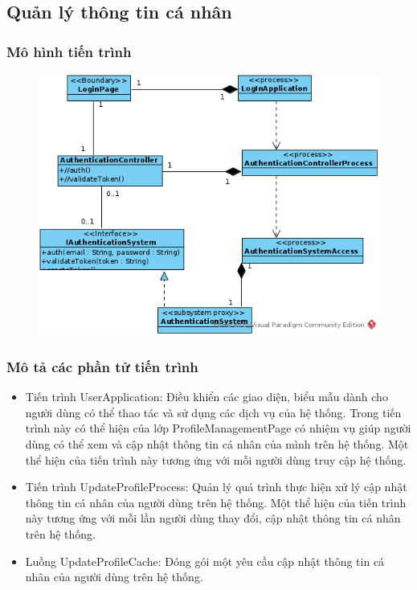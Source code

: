 \documentclass[./../main_file.tex]{subfiles}
\begin{document}
\subsection{Quản lý thông tin cá nhân}

\subsubsection{Mô hình tiến trình}

\begin{figure}[H]
	\centering
	\includegraphics[width=\linewidth]{./images/pv_login.png}
\end{figure}

\subsubsection{Mô tả các phần tử tiến trình}
\begin{itemize}
	\item Tiến trình UserApplication: Điều khiển các giao diện, biểu mẫu dành cho người dùng có thể thao tác và sử dụng các dịch vụ của hệ thống. Trong tiến trình này có  thể hiện của lớp ProfileManagementPage có nhiệm vụ giúp người dùng có thể xem và cập nhật thông tin cá nhân của mình trên hệ thống.
	      Một thể hiện của tiến trình này tương ứng với mỗi người dùng truy cập hệ thống.
	\item Tiến trình UpdateProfileProcess: Quản lý quá trình thực hiện xử lý cập nhật thông tin cá nhân của người dùng trên hệ thống.
	      Một thể hiện của tiến trình này tương ứng với mỗi lần người dùng thay đổi, cập nhật thông tin cá nhân trên hệ thống.
	\item Luồng UpdateProfileCache: Đóng gói một yêu cầu cập nhật thông tin cá nhân của người dùng trên hệ thống.
\end{itemize}
\end{document}
